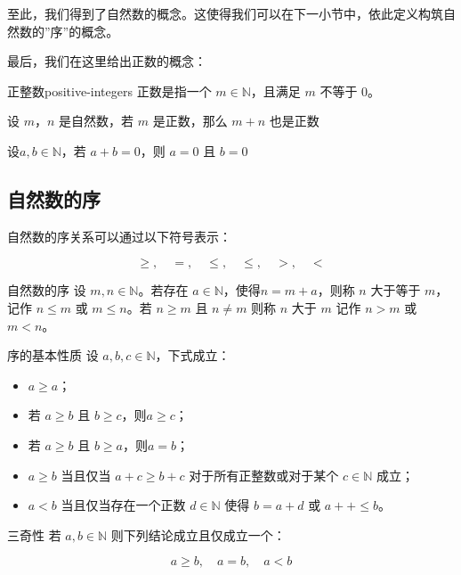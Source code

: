 至此，我们得到了自然数的概念。这使得我们可以在下一小节中，依此定义构筑自然数的''序''的概念。

最后，我们在这里给出正数的概念：

\begin{definition}{正整数}{positive-integers}
	正数是指一个 $m\in \mathbb N$，且满足 $m$ 不等于 $0$。
\end{definition}

\begin{proposition}{}{}
	设 $m$，$n$ 是自然数，若 $m$ 是正数，那么 $m+n$ 也是正数
\end{proposition}

\begin{note}
	设$a,b\in \mathbb N$，若 $a+b=0$，则 $a=0$ 且 $b=0$
\end{note}

\subsection{自然数的序}

自然数的序关系可以通过以下符号表示：

$$
\ge,\quad =,\quad\le,\quad\le,\quad >,\quad <
$$

\begin{definition}{自然数的序}{}
	设 $m,n\in \mathbb N$。若存在 $a\in \mathbb N$，使得$n=m+a$，则称 $n$ 大于等于 $m$，记作 $n\le m$ 或 $m\le n$。若 $n\ge m$ 且 $n\ne m$ 则称 $n$ 大于 $m$ 记作 $n > m$ 或 $m < n$。
\end{definition}

\begin{property}{序的基本性质}{}
	设 $a,b,c\in \mathbb N$，下式成立：
	\begin{itemize}
		\item $a\ge a$；
		\item 若 $a\ge b$ 且 $b \ge c$，则$a\ge c$；
		\item 若 $a\ge b$ 且 $b \ge a$，则$a=b$；
		\item $a \ge b$ 当且仅当 $a+c\ge b+c$ 对于所有正整数或对于某个 $c\in \mathbb N$ 成立；
		\item $a < b$ 当且仅当存在一个正数 $d\in \mathbb N$ 使得 $b=a+d$ 或 $a++\le b$。
	\end{itemize}
\end{property}

\begin{theorem}{三奇性}{}
	若 $a,b\in \mathbb N$ 则下列结论成立且仅成立一个：
	
	$$
	a\ge b,\quad a=b, \quad a<b
	$$
\end{theorem}

